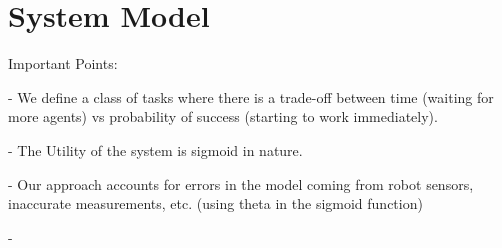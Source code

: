 \documentclass[conference]{IEEETran}
\begin{document}
\section{System Model}
Important Points:

- We define a class of tasks where there is a trade-off between time (waiting for more agents) vs probability of success (starting to work immediately).

- The Utility of the system is sigmoid in nature.

- Our approach accounts for errors in the model coming from robot sensors, inaccurate measurements, etc. (using theta in the sigmoid function)

- 


\end{document}
